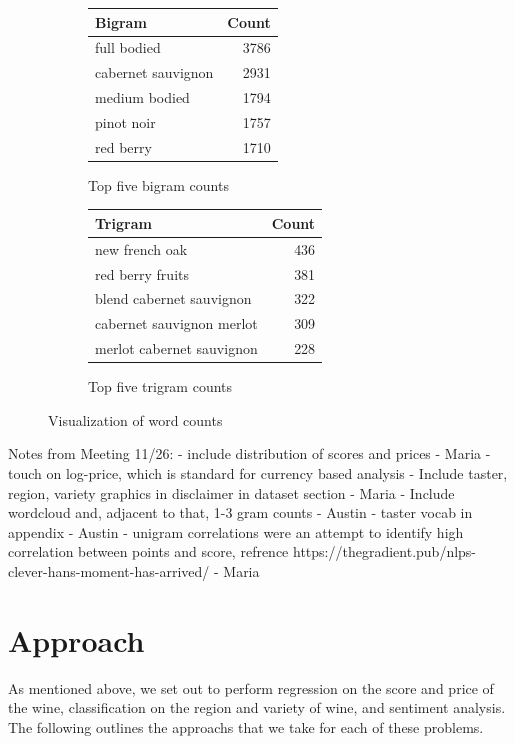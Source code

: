 \documentclass[11pt]{article}
\begin{document}
\begin{figure}
\begin{subfigure}[b]{0.33\textwidth}
        \centering
        \begin{tabular}{ lr  }
            \hline
            Bigram & Count \\
            \hline
            full bodied  & 3786 \\
            cabernet sauvignon & 2931 \\
            medium bodied & 1794 \\
            pinot noir & 1757 \\
            red berry & 1710
        \end{tabular}
        \caption{ Top five bigram counts}
    \end{subfigure}
    \begin{subfigure}[b]{0.33\textwidth}
        \centering
        \begin{tabular}{ lr  }
            \hline
            Trigram & Count \\
            \hline
            new french oak  & 436 \\
            red berry fruits & 381 \\
            blend cabernet sauvignon & 322 \\
            cabernet sauvignon merlot & 309 \\
            merlot cabernet sauvignon & 228 
        \end{tabular}
        \caption{ Top five trigram counts}
    \end{subfigure}
    \caption{Visualization of word counts}
    \end{figure}
    Notes from Meeting 11/26:
    - include distribution of scores and prices - Maria
        - touch on log-price, which is standard for currency based analysis
    - Include taster, region, variety graphics in disclaimer in dataset section - Maria
    - Include wordcloud and, adjacent to that, 1-3 gram counts - Austin
    - taster vocab in appendix - Austin
    - unigram correlations were an attempt to identify high correlation between points and score, refrence https://thegradient.pub/nlps-clever-hans-moment-has-arrived/ - Maria

\section{Approach}
    As mentioned above, we set out to perform regression on the score and price of the wine, classification on the region and variety of wine, and sentiment analysis. The following outlines the approachs that we take for each of these problems.
\end{document}
